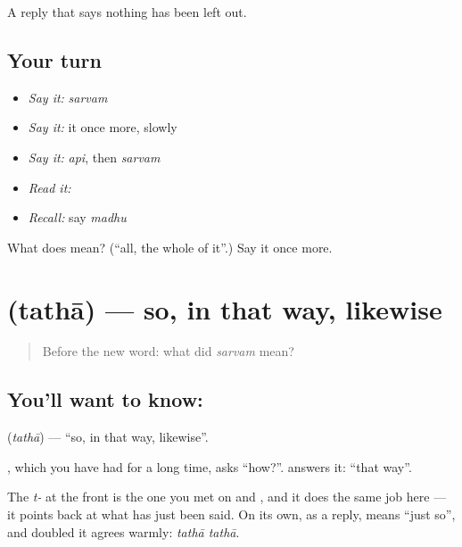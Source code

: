 \begin{grammarlens}[title={What you've built}]
A reply that says nothing has been left out.
\end{grammarlens}

\subsection*{Your turn}
\begin{itemize}
\raggedright
  \item \emph{Say it:} \emph{sarvam}
  \item \emph{Say it:} it once more, slowly
  \item \emph{Say it:} \emph{api}, then \emph{sarvam}
  \item \emph{Read it:} \textbf{}
  \item \emph{Recall:} say \emph{madhu}
\end{itemize}

\begin{tcolorbox}[breakable,colback=teal!4,colframe=teal!35!black,title={Before you move on}]
What does  mean? (\textquotedblleft{}all, the whole of it\textquotedblright{}.) Say it once more.
\end{tcolorbox}
\section[\texorpdfstring{\sk{तथा} (tathā)}{तथा (tathā)}]{ (tathā) — so, in that way, likewise}

\label{lesson:SA-C36-likewise}



\begin{quote}
Before the new word: what did \emph{sarvam} mean?
\end{quote}

\subsection*{You'll want to know: }
\textbf{} (\emph{tathā}) — \textquotedblleft{}so, in that way, likewise\textquotedblright{}.

\textbf{}, which you have had for a long time, asks \textquotedblleft{}how?\textquotedblright{}. \textbf{} answers it: \textquotedblleft{}that way\textquotedblright{}.

The \emph{t-} at the front is the one you met on \textbf{} and \textbf{}, and it does the same job here — it points back at what has just been said. On its own, as a reply, \textbf{} means \textquotedblleft{}just so\textquotedblright{}, and doubled it agrees warmly: \emph{tathā tathā}.

